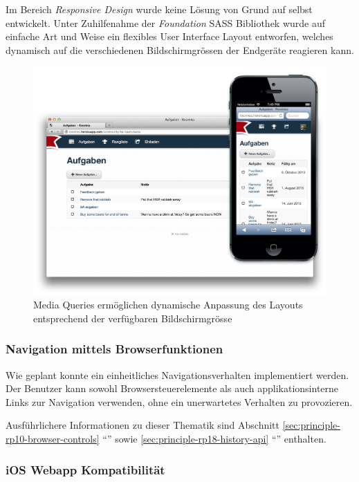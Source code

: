 Im Bereich \emph{Responsive Design} wurde keine Lösung von Grund auf selbst entwickelt. Unter Zuhilfenahme der \emph{Foundation} SASS Bibliothek \cite{Foundation} wurde auf einfache Art und Weise ein flexibles User Interface Layout entworfen, welches dynamisch auf die verschiedenen Bildschirmgrössen der Endgeräte reagieren kann.

\begin{figure}[H]
	\centering
	\includegraphics[width=12cm]{content/principle-demonstration/images/responsive-screenshots.png}
	\caption{Media Queries ermöglichen dynamische Anpassung des Layouts entsprechend der verfügbaren Bildschirmgrösse}
	\label{fig:responsive-screenshots}
\end{figure}


\subsubsection*{Navigation mittels Browserfunktionen}

Wie geplant konnte ein einheitliches Navigationsverhalten implementiert werden. Der Benutzer kann sowohl Browsersteuerelemente als auch applikationsinterne Links zur Navigation verwenden, ohne ein unerwartetes Verhalten zu provozieren.

Ausführlichere Informationen zu dieser Thematik sind Abschnitt \ref{sec:principle-rp10-browser-controls} ``'' sowie \ref{sec:principle-rp18-history-api} ``'' enthalten.


\subsubsection*{iOS Webapp Kompatibilität}

